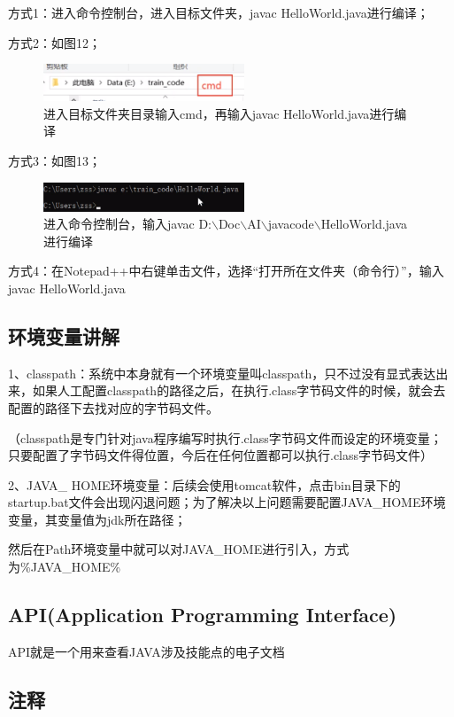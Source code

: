 \documentclass{article}
\begin{document}
		方式1：进入命令控制台，进入目标文件夹，javac HelloWorld.java进行编译；
		
		方式2：如图12；
\begin{figure}[ht]
	\centering
	\includegraphics[width=60mm]{12.png}
	\caption{进入目标文件夹目录输入cmd，再输入javac HelloWorld.java进行编译}
	\label{fig:label}
\end{figure}		

		方式3：如图13；
		\begin{figure}[ht]
			\centering
			\includegraphics[width=60mm]{13.png}
			\caption{进入命令控制台，输入javac D:$\backslash$Doc$\backslash$AI$\backslash$javacode$\backslash$HelloWorld.java进行编译}
			\label{fig:label}
		\end{figure}	
	
		方式4：在Notepad++中右键单击文件，选择“打开所在文件夹（命令行）”，输入javac HelloWorld.java
		
		\subsection{环境变量讲解}
		
		1、classpath：系统中本身就有一个环境变量叫classpath，只不过没有显式表达出来，如果人工配置classpath的路径之后，在执行.class字节码文件的时候，就会去配置的路径下去找对应的字节码文件。
		
		（classpath是专门针对java程序编写时执行.class字节码文件而设定的环境变量；只要配置了字节码文件得位置，今后在任何位置都可以执行.class字节码文件）
		
		2、JAVA\_ HOME环境变量：后续会使用tomcat软件，点击bin目录下的startup.bat文件会出现闪退问题；为了解决以上问题需要配置JAVA\_HOME环境变量，其变量值为jdk所在路径；
		
		然后在Path环境变量中就可以对JAVA\_HOME进行引入，方式为\%JAVA\_HOME\%
		
		\subsection{API(Application Programming  Interface)}
		
		API就是一个用来查看JAVA涉及技能点的电子文档
		
		\subsection{注释}
		
\end{document}
